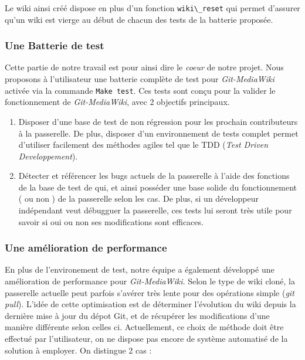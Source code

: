 \documentclass[11pt]{article}
\begin{document}
Le wiki ainsi créé dispose en plus d'un fonction 
\lstinline!wiki\_reset! qui permet d'assurer qu'un wiki est vierge
au début de chacun des tests de la batterie proposée.

\subsubsection{Une Batterie de test}

Cette partie de notre travail est pour ainsi dire le \textit{coeur} 
de notre projet. Nous proposons à l'utilisateur une batterie complète
de test pour \textit{Git-MediaWiki} activée via la commande 
\lstinline!Make test!. Ces tests sont conçu pour la valider le 
fonctionnement de \textit{Git-MediaWiki}, avec 2 objectifs principaux.

\begin{enumerate}
\item Disposer d'une base de test de non régression pour les prochain 
  contributeurs à la passerelle. De plus, disposer d'un environnement de 
  tests complet permet d'utiliser facilement des méthodes agiles tel que
  le TDD (\textit{Test Driven Developpement}). \\
\item Détecter et référencer les bugs actuels de la passerelle à l'aide
  des fonctions de la base de test de qui, et ainsi posséder une base 
  solide du fonctionnement ( ou non ) de la passerelle selon les cas. De
  plus, si un développeur indépendant veut débugguer la passerelle, ces 
  tests lui seront très utile pour savoir si oui ou non ses modifications
  sont efficaces.
\end{enumerate}

\subsubsection{Une amélioration de performance}

En plus de l'environement de test, notre équipe a également développé 
une amélioration de performance pour \textit{Git-MediaWiki}. Selon le
type de wiki cloné, la passerelle actuelle peut parfois s'avérer très
lente pour des opérations simple (\textit{git pull}). L'idée de cette
optimisation est de déterminer l'évolution du wiki depuis la dernière
mise à jour du dépot Git, et de récupérer les modifications d'une 
manière différente selon celles ci. Actuellement, ce choix de méthode
doit être effectué par l'utilisateur, on ne dispose pas encore de
système automatisé de la solution à employer.  On distingue 2 cas :
\end{document}
